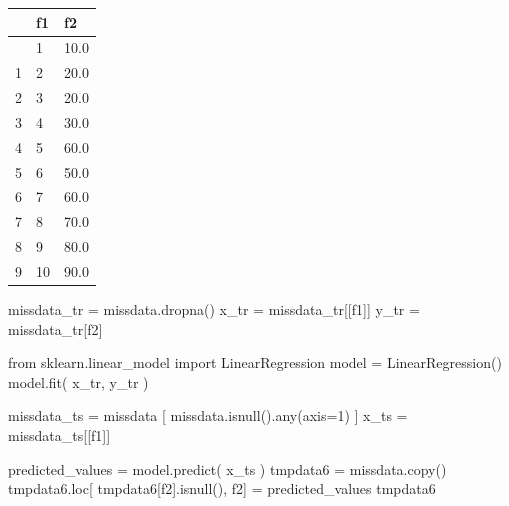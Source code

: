 \documentclass[
  a4paper,
  DIV=11,
  numbers=noendperiod]{scrreprt}
\newenvironment{Shaded}{\begin{snugshade}}{\end{snugshade}}
\newcommand{\BuiltInTok}[1]{\textcolor[rgb]{0.00,0.23,0.31}{#1}}
\newcommand{\DecValTok}[1]{\textcolor[rgb]{0.68,0.00,0.00}{#1}}
\newcommand{\ImportTok}[1]{\textcolor[rgb]{0.00,0.46,0.62}{#1}}
\newcommand{\NormalTok}[1]{\textcolor[rgb]{0.00,0.23,0.31}{#1}}
\newcommand{\OperatorTok}[1]{\textcolor[rgb]{0.37,0.37,0.37}{#1}}
\newcommand{\StringTok}[1]{\textcolor[rgb]{0.13,0.47,0.30}{#1}}
\begin{document}
\begin{longtable}[]{@{}lll@{}}
\toprule\noalign{}
& f1 & f2 \\
\midrule\noalign{}
\endhead
\bottomrule\noalign{}
\endlastfoot
0 & 1 & 10.0 \\
1 & 2 & 20.0 \\
2 & 3 & 20.0 \\
3 & 4 & 30.0 \\
4 & 5 & 60.0 \\
5 & 6 & 50.0 \\
6 & 7 & 60.0 \\
7 & 8 & 70.0 \\
8 & 9 & 80.0 \\
9 & 10 & 90.0 \\
\end{longtable}

\begin{Shaded}
\begin{Highlighting}[]
\NormalTok{missdata\_tr }\OperatorTok{=}\NormalTok{ missdata.dropna()}
\NormalTok{x\_tr }\OperatorTok{=}\NormalTok{ missdata\_tr[[}\StringTok{\textquotesingle{}f1\textquotesingle{}}\NormalTok{]]}
\NormalTok{y\_tr }\OperatorTok{=}\NormalTok{ missdata\_tr[}\StringTok{\textquotesingle{}f2\textquotesingle{}}\NormalTok{]}

\ImportTok{from}\NormalTok{ sklearn.linear\_model }\ImportTok{import}\NormalTok{ LinearRegression}
\NormalTok{model }\OperatorTok{=}\NormalTok{ LinearRegression()}
\NormalTok{model.fit( x\_tr, y\_tr )}

\NormalTok{missdata\_ts }\OperatorTok{=}\NormalTok{ missdata [ missdata.isnull().}\BuiltInTok{any}\NormalTok{(axis}\OperatorTok{=}\DecValTok{1}\NormalTok{) ]}
\NormalTok{x\_ts }\OperatorTok{=}\NormalTok{ missdata\_ts[[}\StringTok{\textquotesingle{}f1\textquotesingle{}}\NormalTok{]]}

\NormalTok{predicted\_values }\OperatorTok{=}\NormalTok{ model.predict( x\_ts )}
\NormalTok{tmpdata6 }\OperatorTok{=}\NormalTok{ missdata.copy()}
\NormalTok{tmpdata6.loc[ tmpdata6[}\StringTok{\textquotesingle{}f2\textquotesingle{}}\NormalTok{].isnull(), }\StringTok{\textquotesingle{}f2\textquotesingle{}}\NormalTok{] }\OperatorTok{=}\NormalTok{ predicted\_values}
\NormalTok{tmpdata6}
\end{Highlighting}
\end{Shaded}
\end{document}

